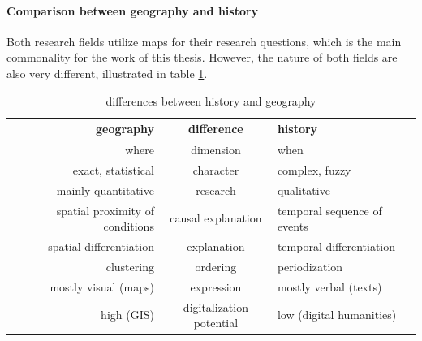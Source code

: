 

\paragraph{Comparison between geography and history} %
\label{par:comparison_of_geography_and_history}

Both research fields utilize maps for their research questions, which is the main commonality for the work of this thesis. However, the nature of both fields are also very different, illustrated in table \ref{tab:history_vs_geography}.

\begin{table}[ht]
\begin{center}
\begin{tabular}{p{0px} r c l p{0px}}
    \toprule
    & geography
    & difference
    & history
    & \\
    \midrule
    & where
    & dimension
    & when
    & \\

    & exact, statistical
    & character
    & complex, fuzzy
    & \\

    & mainly quantitative
    & research
    & qualitative
    & \\

    & spatial proximity of conditions
    & causal explanation
    & temporal sequence of events
    & \\

    & spatial differentiation
    & explanation
    & temporal differentiation
    & \\

    & clustering
    & ordering
    & periodization
    & \\

    & mostly visual (maps)
    & expression
    & mostly verbal (texts)
    & \\

    & high (GIS)
    & digitalization potential
    & low (digital humanities)
    & \\
    \bottomrule
\end{tabular}
\caption{differences between history and geography}
\small{\cite[pp. 2-4]{knowles2008placing}}
\label{tab:history_vs_geography}
\end{center}
\end{table}


